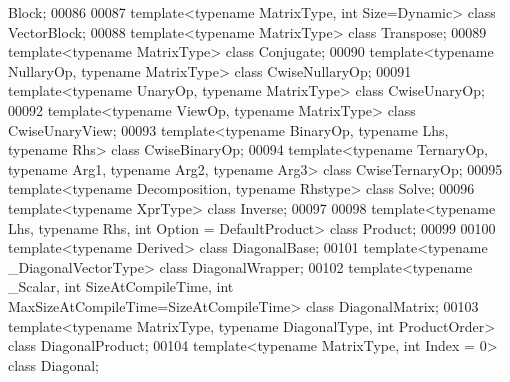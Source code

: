 \begin{DoxyCode}
      Block;
00086 
00087 \textcolor{keyword}{template}<\textcolor{keyword}{typename} MatrixType, \textcolor{keywordtype}{int} Size=Dynamic> \textcolor{keyword}{class }VectorBlock;
00088 \textcolor{keyword}{template}<\textcolor{keyword}{typename} MatrixType> \textcolor{keyword}{class }Transpose;
00089 \textcolor{keyword}{template}<\textcolor{keyword}{typename} MatrixType> \textcolor{keyword}{class }Conjugate;
00090 \textcolor{keyword}{template}<\textcolor{keyword}{typename} NullaryOp, \textcolor{keyword}{typename} MatrixType>         \textcolor{keyword}{class }CwiseNullaryOp;
00091 \textcolor{keyword}{template}<\textcolor{keyword}{typename} UnaryOp,   \textcolor{keyword}{typename} MatrixType>         \textcolor{keyword}{class }CwiseUnaryOp;
00092 \textcolor{keyword}{template}<\textcolor{keyword}{typename} ViewOp,    \textcolor{keyword}{typename} MatrixType>         \textcolor{keyword}{class }CwiseUnaryView;
00093 \textcolor{keyword}{template}<\textcolor{keyword}{typename} BinaryOp,  \textcolor{keyword}{typename} Lhs, \textcolor{keyword}{typename} Rhs>  \textcolor{keyword}{class }CwiseBinaryOp;
00094 \textcolor{keyword}{template}<\textcolor{keyword}{typename} TernaryOp, \textcolor{keyword}{typename} Arg1, \textcolor{keyword}{typename} Arg2, \textcolor{keyword}{typename} Arg3>  \textcolor{keyword}{class }CwiseTernaryOp;
00095 \textcolor{keyword}{template}<\textcolor{keyword}{typename} Decomposition, \textcolor{keyword}{typename} Rhstype>        \textcolor{keyword}{class }Solve;
00096 \textcolor{keyword}{template}<\textcolor{keyword}{typename} XprType>                                \textcolor{keyword}{class }Inverse;
00097 
00098 \textcolor{keyword}{template}<\textcolor{keyword}{typename} Lhs, \textcolor{keyword}{typename} Rhs, \textcolor{keywordtype}{int} Option = DefaultProduct> \textcolor{keyword}{class }Product;
00099 
00100 \textcolor{keyword}{template}<\textcolor{keyword}{typename} Derived> \textcolor{keyword}{class }DiagonalBase;
00101 \textcolor{keyword}{template}<\textcolor{keyword}{typename} \_DiagonalVectorType> \textcolor{keyword}{class }DiagonalWrapper;
00102 \textcolor{keyword}{template}<\textcolor{keyword}{typename} \_Scalar, \textcolor{keywordtype}{int} SizeAtCompileTime, \textcolor{keywordtype}{int} MaxSizeAtCompileTime=SizeAtCompileTime> \textcolor{keyword}{class }
      DiagonalMatrix;
00103 \textcolor{keyword}{template}<\textcolor{keyword}{typename} MatrixType, \textcolor{keyword}{typename} DiagonalType, \textcolor{keywordtype}{int} ProductOrder> \textcolor{keyword}{class }DiagonalProduct;
00104 \textcolor{keyword}{template}<\textcolor{keyword}{typename} MatrixType, \textcolor{keywordtype}{int} Index = 0> \textcolor{keyword}{class }Diagonal;

\end{DoxyCode}
